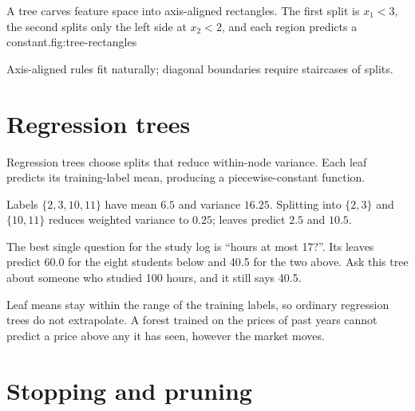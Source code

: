 \begin{utpfig}{A tree carves feature space into axis-aligned rectangles. The first split is $x_1<3$, the second splits only the left side at $x_2<2$, and each region predicts a constant.}{fig:tree-rectangles}
\end{utpfig}

Axis-aligned rules fit naturally; diagonal boundaries require staircases of splits.

\section{Regression trees}

Regression trees choose splits that reduce within-node variance. Each leaf predicts its training-label mean, producing a piecewise-constant function.

\begin{workedexample}
Labels $\{2,3,10,11\}$ have mean $6.5$ and variance $16.25$. Splitting into $\{2,3\}$ and $\{10,11\}$ reduces weighted variance to $0.25$; leaves predict $2.5$ and $10.5$.
\end{workedexample}

\begin{workedexample}
The best single question for the study log is ``hours at most 17?''. Its leaves predict 60.0 for the eight students below and 40.5 for the two above. Ask this tree about someone who studied 100 hours, and it still says 40.5.
\end{workedexample}

Leaf means stay within the range of the training labels, so ordinary regression trees do not extrapolate. A forest trained on the prices of past years cannot predict a price above any it has seen, however the market moves.

\section{Stopping and pruning}

